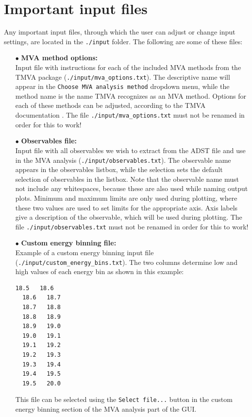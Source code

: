\documentclass[12pt,a4paper]{report}
\begin{document}
\section{Important input files}
Any important input files, through which the user can adjust or change input settings, are located in the \texttt{./input} folder. The following are some of these files:
\begin{itemize}
\item[$\bullet$] \textbf{MVA method options:}\\Input file with instructions for each of the included MVA methods from the TMVA package (\texttt{./input/mva\_options.txt}). The descriptive name will appear in the \texttt{Choose MVA analysis method} dropdown menu, while the method name is the name TMVA recognizes as an MVA method. Options for each of these methods can be adjusted, according to the TMVA documentation \cite{tmvadocument}. The file \texttt{./input/mva\_options.txt} must not be renamed in order for this to work!
\item[$\bullet$] \textbf{Observables file:}\\Input file with all observables we wish to extract from the ADST file and use in the MVA analysis (\texttt{./input/observables.txt}). The observable name appears in the observables listbox, while the selection sets the default selection of observables in the listbox. Note that the observable name must not include any whitespaces, because these are also used while naming output plots. Minimum and maximum limits are only used during plotting, where these two values are used to set limits for the appropriate axis. Axis labels give a description of the observable, which will be used during plotting. The file \texttt{./input/observables.txt} must not be renamed in order for this to work!
\item[$\bullet$] \textbf{Custom energy binning file:}\\Example of a custom energy binning input file \\(\texttt{./input/custom\_energy\_bins.txt}). The two columns determine low and high values of each energy bin as shown in this example:
\begin{lstlisting}[language=bash]
  18.5   18.6
  18.6   18.7
  18.7   18.8
  18.8   18.9
  18.9   19.0
  19.0   19.1
  19.1   19.2
  19.2   19.3
  19.3   19.4
  19.4   19.5
  19.5   20.0
\end{lstlisting}
This file can be selected using the \texttt{Select file...} button in the custom energy binning section of the MVA analysis part of the GUI.

\end{itemize}
\end{document}
